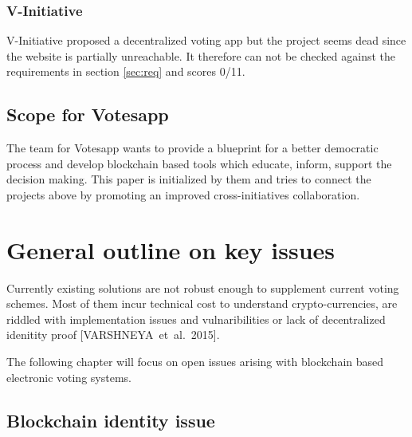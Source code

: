 \documentclass[9pt,oneside]{amsart}
\begin{document}
\begin{multicols}{2}
\subsubsection{V-Initiative}
V-Initiative proposed a decentralized voting app but the project seems dead since the website is partially unreachable. It therefore can not be checked against the requirements in section \ref{sec:req} and scores 0/11.

\subsection{Scope for Votesapp}
The team for Votesapp wants to provide a blueprint for a better democratic process and develop blockchain based tools which educate, inform, support the decision making. This paper is initialized by them and tries to connect the projects above by promoting an improved cross-initiatives collaboration.

\section{General outline on key issues}
Currently existing solutions are not robust enough to supplement current voting schemes. Most of them incur technical cost to understand crypto-currencies, are riddled with implementation issues and vulnaribilities or lack of decentralized idenitity proof [VARSHNEYA~et~al.~2015].\par
The following chapter will focus on open issues arising with blockchain based electronic voting systems.

\subsection{Blockchain identity issue}


\end{multicols}
\end{document}
